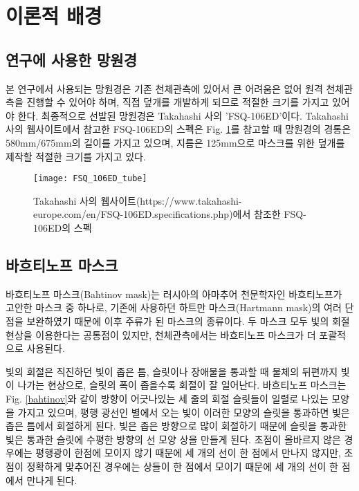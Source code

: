 \section{이론적 배경}


\subsection{연구에 사용한 망원경}

본 연구에서 사용되는 망원경은 기존 천체관측에 있어서 큰 어려움은 없어 원격 천체관측을 진행할 수 있어야 하며, 직접 덮개를 개발하게 되므로 적절한 크기를 가지고 있어야 한다. 최종적으로 선발된 망원경은 Takahashi 사의 'FSQ-106ED'이다. Takahashi 사의 웹사이트에서 참고한 FSQ-106ED의 스펙은 Fig. \ref{FSQ}를 참고할 때 망원경의 경통은 580mm/675mm의 길이를 가지고 있으며, 지름은 125mm으로 마스크를 위한 덮개를 제작할 적절한 크기를 가지고 있다.

\begin{figure}[h]
	\begin{center}
		\texttt{[image: FSQ\_106ED\_tube]}
	\end{center}
	\caption{Takahashi 사의 웹사이트(https://www.takahashi-europe.com/en/FSQ-106ED.specifications.php)에서 참조한 FSQ-106ED의 스펙}
	\label{FSQ}
\end{figure}

\subsection{바흐티노프 마스크}

바흐티노프 마스크(Bahtinov mask)는 러시아의 아마추어 천문학자인 바흐티노프가 고안한 마스크 중 하나로, 기존에 사용하던 하트만 마스크(Hartmann mask)의 여러 단점을 보완하였기 때문에 이후 주류가 된 마스크의 종류이다. 두 마스크 모두 빛의 회절 현상을 이용한다는 공통점이 있지만, 천체관측에서는 바흐티노프 마스크가 더 포괄적으로 사용된다. 

빛의 회절은 직진하던 빛이 좁은 틈, 슬릿이나 장애물을 통과할 때 물체의 뒤편까지 빛이 나가는 현상으로, 슬릿의 폭이 좁을수록 회절이 잘 일어난다. 바흐티노프 마스크는 Fig. \ref{bahtinov}와 같이 방향이 어긋나있는 세 줄의 회절 슬릿들이 일렬로 나있는 모양을 가지고 있으며, 평행 광선인 별에서 오는 빛이 이러한 모양의 슬릿을 통과하면 빛은 좁은 틈에서 회절하게 된다. 빛은 좁은 방향으로 많이 회절하기 때문에 슬릿을 통과한 빛은 통과한 슬릿에 수평한 방향의 선 모양 상을 만들게 된다. 초점이 올바르지 않은 경우에는 평행광이 한점에 모이지 않기 때문에 세 개의 선이 한 점에서 만나지 않지만, 초점이 정확하게 맞추어진 경우에는 상들이 한 점에서 모이기 때문에 세 개의 선이 한 점에서 만나게 된다.

